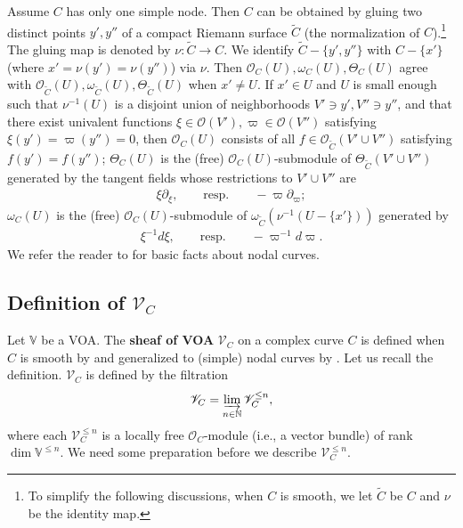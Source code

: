 \documentclass[11pt,b5paper,notitlepage]{article}
\theoremstyle{definition}
\theoremstyle{plain}
\newcommand{\wtd}{\widetilde}
\newcommand{\scr}{\mathscr}
\newcommand{\Vbb}{\mathbb V}
\newcommand{\Nbb}{\mathbb N}
\numberwithin{equation}{section}
\begin{document}
Assume $C$ has only one simple node. Then $C$ can be obtained by gluing two distinct points $y',y''$ of a compact Riemann surface $\wtd C$ (the normalization of $C$).\footnote{To simplify the following discussions, when $C$ is smooth, we let $\wtd C$ be $C$ and $\nu$ be the identity map.} The gluing map is denoted by $\nu:\wtd C\rightarrow C$. We identify $\wtd C-\{y',y''\}$ with $C-\{x'\}$ (where $x'=\nu(y')=\nu(y'')$) via $\nu$. Then  $\scr O_C(U),\omega_C(U),\Theta_C(U)$ agree with $\scr O_{\wtd C}(U),\omega_{\wtd C}(U),\Theta_{\wtd C}(U)$ when $x'\neq U$. If $x'\in U$ and $U$ is small enough such that $\nu^{-1}(U)$ is a disjoint union of neighborhoods $V'\ni y',V''\ni y''$, and that there exist univalent functions $\xi\in\scr O(V'),\varpi\in\scr O(V'')$ satisfying $\xi(y')=\varpi(y'')=0$, then $\scr O_C(U)$ consists of all $f\in\scr O_{\wtd C}(V'\cup V'')$ satisfying $f(y')=f(y'')$; $\Theta_C(U)$ is the (free) $\scr O_C(U)$-submodule of $\Theta_{\wtd C}(V'\cup V'')$ generated by the tangent fields whose restrictions to $V'\cup V''$ are 
\begin{align}
\xi\partial_\xi,\qquad \text{resp.}\qquad -\varpi\partial_\varpi;\label{eq9}
\end{align}   
$\omega_C(U)$ is the (free) $\scr O_C(U)$-submodule of $\omega_{\wtd C}(\nu^{-1}(U-\{x'\}))$ generated by
\begin{align*}
\xi^{-1}d\xi,\qquad \text{resp.}\qquad -\varpi^{-1}d\varpi.
\end{align*}  
We refer the reader to \cite[Chap.X]{ACG11} for  basic facts about nodal curves.




\subsection*{Definition of $\scr V_C$}


Let $\Vbb$ be a VOA. The \textbf{sheaf of VOA} $\scr V_C$ on a complex curve $C$ is defined when $C$ is smooth by \cite{FB04} and generalized to (simple) nodal curves by \cite{DGT19a}. Let us recall the definition.\index{VC@$\scr V_C,\scr V_C^{\leq n}$} $\scr V_C$ is defined by the filtration
\begin{align*}
\scr V_C=\varinjlim_{n\in\Nbb}\scr V_C^{\leq n},
\end{align*}
where each $\scr V_C^{\leq n}$ is a  locally free $\scr O_C$-module (i.e., a vector bundle) of rank $\dim\Vbb^{\leq n}$. We need some preparation before we describe $\scr V_C^{\leq n}$.
\end{document}

